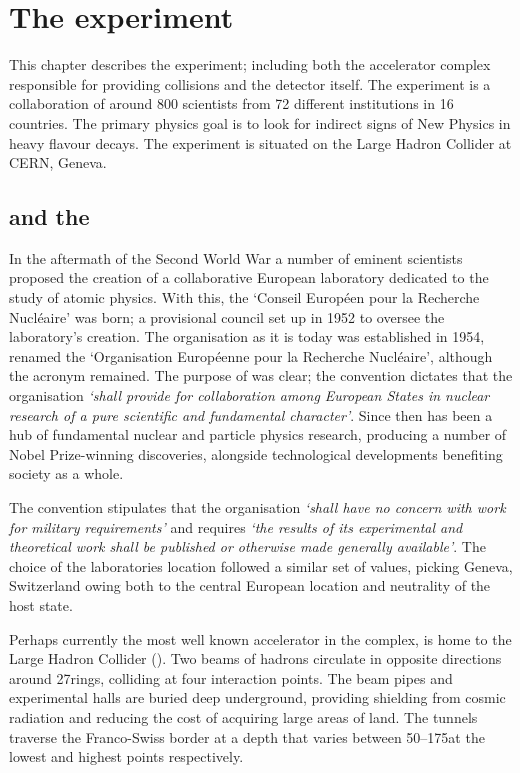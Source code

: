 \chapter{The \lhcb experiment} 
\label{ch:detector}
\minitoc


This chapter describes the \lhcb experiment; including both the accelerator complex responsible for providing \proton\proton collisions and the \lhcb detector itself.  
The \lhcb experiment is a collaboration of around 800 scientists from 72 different institutions in 16 countries. The primary physics goal is to look for indirect signs of New Physics in heavy flavour decays. The experiment is situated on the Large Hadron Collider at CERN, Geneva. 



\section{\cern and the \lhc}


In the aftermath of the Second World War a number of eminent scientists proposed the creation of a collaborative European laboratory dedicated to the study of atomic physics. With this, the `Conseil Europ\'een pour la Recherche Nucl\'eaire' was born; a provisional council set up in 1952 to oversee the laboratory's creation.  The organisation as it is today was established in 1954, renamed the `Organisation Europ\'eenne pour la Recherche Nucl\'eaire', although the acronym \cern remained. 
The purpose of \cern was clear; the convention dictates that the organisation \emph{`shall provide for collaboration among European States in nuclear research of a pure scientific and fundamental character'}.
Since then \cern has been a hub of fundamental nuclear and particle physics research, producing a number of Nobel Prize-winning discoveries, alongside technological developments benefiting society as a whole.

The convention stipulates that the organisation \emph{`shall have no concern with work for military requirements'} and  
requires \emph{`the results of its experimental and theoretical work shall be published or otherwise made generally available'}. 
The choice of the laboratories location followed a similar set of values, picking Geneva, Switzerland owing both to the central European location and neutrality of the host state. 


Perhaps currently the most well known accelerator in the complex, \cern is home to the Large Hadron Collider (\lhc). Two beams of hadrons circulate in opposite directions around 27\km rings, colliding at four interaction points. The beam pipes and experimental halls are buried deep underground, providing shielding from cosmic radiation and reducing the cost of acquiring large areas of land. The tunnels traverse the Franco-Swiss border at a depth that varies between 50--175\m at the lowest and highest points respectively.      

